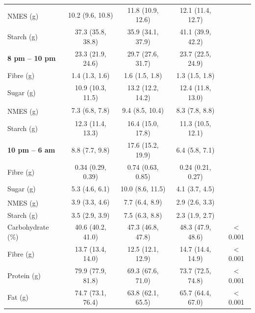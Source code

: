 \begin{table}[H]
\begin{tabular}[t]{lcccc}
		\hspace{3em}NMES (g)\textsuperscript{\dag} & 10.2 (9.6, 10.8) & 11.8 (10.9, 12.6) & 12.1 (11.4, 12.7) & \\
		\hspace{2em}Starch (g) & 37.3 (35.8, 38.8) & 35.9 (34.1, 37.9) & 41.1 (39.9, 42.2) & \\
		\hspace{1em}\textbf{8 pm – 10 pm} & 23.3 (21.9, 24.6) & 29.7 (27.6, 31.7) & 23.7 (22.5, 24.9) & \\
		\hspace{2em}Fibre (g) & 1.4 (1.3, 1.6) & 1.6 (1.5, 1.8) & 1.3 (1.5, 1.8) & \\
		\hspace{2em}Sugar (g) & 10.9 (10.3, 11.5) & 13.2 (12.2, 14.2) & 12.4 (11.8, 13.0) & \\
		\hspace{3em}NMES (g)\textsuperscript{\dag} & 7.3 (6.8, 7.8) & 9.4 (8.5, 10.4) & 8.3 (7.8, 8.8) & \\
		\hspace{2em}Starch (g) & 12.3 (11.4, 13.3) & 16.4 (15.0, 17.8) & 11.3 (10.5, 12.1) & \\
		\hspace{1em}\textbf{10 pm – 6 am} & 8.8 (7.7, 9.8) & 17.6 (15.2, 19.9) & 6.4 (5.8, 7.1) & \\
		\hspace{2em}Fibre (g) & 0.34 (0.29, 0.39) & 0.74 (0.63, 0.85) & 0.24 (0.21, 0.27) & \\
		\hspace{2em}Sugar (g) & 5.3 (4.6, 6.1) & 10.0 (8.6, 11.5) & 4.1 (3.7, 4.5) & \\
		\hspace{3em}NMES (g)\textsuperscript{\dag} & 3.9 (3.3, 4.6) & 7.7 (6.4, 8.9) & 2.9 (2.6, 3.3) & \\
		\hspace{2em}Starch (g) & 3.5 (2.9, 3.9) & 7.5 (6.3, 8.8) & 2.3 (1.9, 2.7) & \\
		Carbohydrate (\%) & 40.6 (40.2, 41.0) & 47.3 (46.8, 47.8) & 48.3 (47.9, 48.6) & < 0.001\\
		Fibre (g) & 13.7 (13.4, 14.0) & 12.5 (12.1, 12.9) & 14.7 (14.4, 14.9) & < 0.001 \\
		Protein (g) & 79.9 (77.9, 81.8) & 69.3 (67.6, 71.0) & 73.7 (72.5, 74.8) & < 0.001\\
		Fat (g) & 74.7 (73.1, 76.4) & 63.8 (62.1, 65.5) & 65.7 (64.4, 67.0) & < 0.001\\

\end{tabular}
\end{table}
